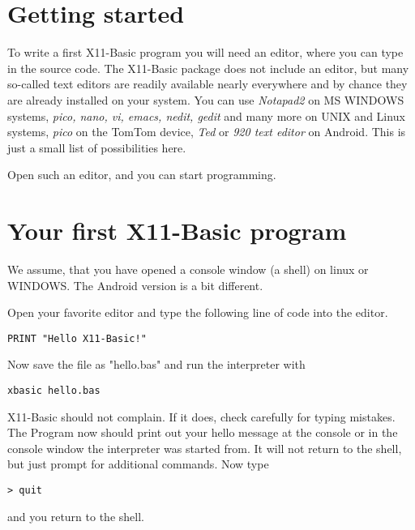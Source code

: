 \section{Getting started}

To write a first X11-Basic program you will need an editor, where you can type
in the source code. The X11-Basic package does not include an editor, but many
so-called text editors are readily available nearly everywhere and by chance
they are already installed on your system. You can use {\normalfont \itshape Notapad2} on MS
WINDOWS systems, {\normalfont \itshape pico, nano, vi, emacs, nedit, gedit} and many more on
UNIX and Linux systems, {\normalfont \itshape pico} on the TomTom device, {\normalfont \itshape Ted} or {\normalfont \itshape 920
text editor} on Android. This is just a small list of possibilities here. 

Open such an editor, and you can start programming.

\section{Your first X11-Basic program}

We assume, that you have opened a console window (a shell) on linux or WINDOWS. 
The Android version is a bit different. 

Open your favorite editor and type the following line of code into the editor. 

\begin{mdframed}[hidealllines=true,backgroundcolor=blue!20]
\begin{verbatim}
PRINT "Hello X11-Basic!"
\end{verbatim}
\end{mdframed}

Now save the file as "hello.bas" and run the interpreter with 
\begin{mdframed}[hidealllines=true,backgroundcolor=black!20]
\begin{verbatim}
xbasic hello.bas
\end{verbatim}
\end{mdframed}

X11-Basic should not complain. If it does, check carefully for typing mistakes.
The Program now should print out your hello message at the console or in the 
console window the interpreter was started from. It will not return to the 
shell, but just prompt for additional commands. Now type
\begin{mdframed}[hidealllines=true,backgroundcolor=black!20]
\begin{verbatim}
> quit
\end{verbatim}
\end{mdframed}
and you return to the shell. 

